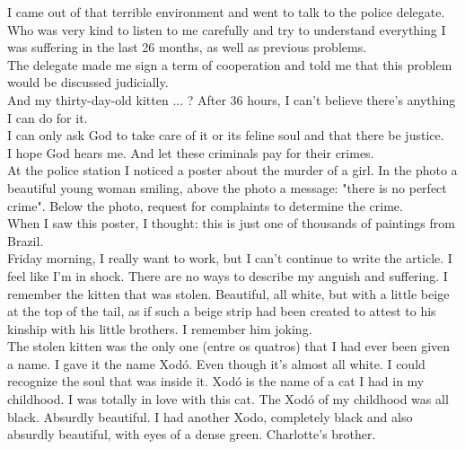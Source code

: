 \documentclass[11pt]{book}
\begin{document}
\noindent I came out of that terrible environment and went to talk to the police delegate. Who was very kind to listen to me carefully and try to understand everything I was suffering in the last 26 months, as well as previous problems. \\

\noindent The delegate made me sign a term of cooperation and told me that this problem would be discussed judicially. \\

\noindent And my thirty-day-old kitten ... ? After 36 hours, I can't believe there's anything I can do for it. \\

\noindent I can only ask God to take care of it or its feline soul and that there be justice. \\

\noindent I hope God hears me. And let these criminals pay for their crimes. \\

\noindent At the police station I noticed a poster about the murder of a girl. In the photo a beautiful young woman smiling, above the photo a message: "there is no perfect crime". Below the photo, request for complaints to determine the crime. \\

\noindent When I saw this poster, I thought: this is just one of thousands of paintings from Brazil. \\

\noindent Friday morning, I really want to work, but I can't continue to write the article. I feel like I'm in shock. There are no ways to describe my anguish and suffering. I remember the kitten that was stolen. Beautiful, all white, but with a little beige at the top of the tail, as if such a beige strip had been created to attest to his kinship with his little brothers. I remember him joking. \\

\noindent The stolen kitten was the only one (entre os quatros) that I had ever been given a name. I gave it the name Xodó. Even though it's almost all white. I could recognize the soul that was inside it. Xodó is the name of a cat I had in my childhood. I was totally in love with this cat. The Xodó of my childhood was all black. Absurdly beautiful. I had another Xodo, completely black and also absurdly beautiful, with eyes of a dense green. Charlotte's brother. \\
\end{document}
